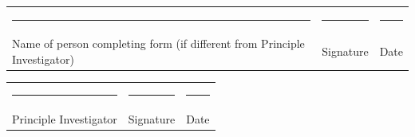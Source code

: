 \documentclass[a4paper,10pt]{article}
\begin{document}
\begin{enumerate}
 \end{enumerate}

 \begin{tabular}{p{4cm}p{4cm}p{4cm}}
    \rule{10em}{.3pt} & \rule{10em}{.3pt} & \rule{10em}{.3pt} \\
     Name of person completing form (if different from Principle Investigator) & Signature &  Date \\
\end{tabular}

\vspace{0.5cm}

 \begin{tabular}{p{4cm}p{4cm}p{4cm}}
    \rule{10em}{.3pt} & \rule{10em}{.3pt} & \rule{10em}{.3pt} \\
     Principle Investigator & Signature &  Date \\
 \end{tabular}
\end{document}
